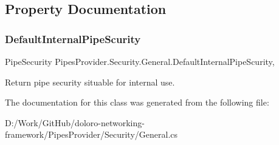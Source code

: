 \subsection{Property Documentation}
\mbox{\label{class_pipes_provider_1_1_security_1_1_general_a49b6c46c031ae200885fcababfdb32c3}} 
\subsubsection{\texorpdfstring{Default\+Internal\+Pipe\+Scurity}{DefaultInternalPipeScurity}}
{\footnotesize\ttfamily Pipe\+Security Pipes\+Provider.\+Security.\+General.\+Default\+Internal\+Pipe\+Scurity\hspace{0.3cm}{\ttfamily [static]}, {\ttfamily [get]}}



Return pipe security situable for internal use. 



The documentation for this class was generated from the following file\+:\begin{DoxyCompactItemize}
\item 
D\+:/\+Work/\+Git\+Hub/doloro-\/networking-\/framework/\+Pipes\+Provider/\+Security/General.\+cs\end{DoxyCompactItemize}
